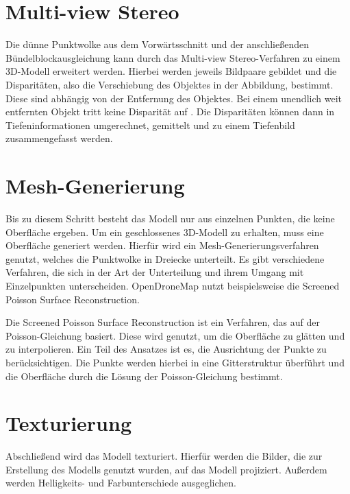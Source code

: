 \documentclass[./00PhotoBox.tex]{subfiles}
\begin{document}
\section{Multi-view Stereo}
Die dünne Punktwolke aus dem Vorwärtsschnitt und der anschließenden Bündel\-block\-ausgleichung kann durch das Multi-view Stereo-Verfahren zu einem 3D-Modell erweitert werden. Hierbei werden jeweils Bildpaare gebildet und die Disparitäten, also die Verschiebung des Objektes in der Abbildung, bestimmt. Diese sind abhängig von der Entfernung des Objektes. Bei einem unendlich weit entfernten Objekt tritt keine Disparität auf \citep[S. 313]{luhmann}. Die Disparitäten können dann in Tiefeninformationen umgerechnet, gemittelt und zu einem Tiefenbild zusammengefasst werden. \citep[S. 505]{luhmann}

\section{Mesh-Generierung}
Bis zu diesem Schritt besteht das Modell nur aus einzelnen Punkten, die keine Oberfläche ergeben. Um ein geschlossenes 3D-Modell zu erhalten, muss eine Oberfläche generiert werden. Hierfür wird ein Mesh-Generierungsverfahren genutzt, welches die Punktwolke in Dreiecke unterteilt. Es gibt verschiedene Verfahren, die sich in der Art der Unterteilung und ihrem Umgang mit Einzelpunkten unterscheiden. OpenDroneMap nutzt beispielsweise die Screened Poisson Surface Reconstruction. \citep[S. 52f]{opendronemap}

Die Screened Poisson Surface Reconstruction ist ein Verfahren, das auf der Poisson-Gleichung basiert. Diese wird genutzt, um die Oberfläche zu glätten und zu interpolieren. Ein Teil des Ansatzes ist es, die Ausrichtung der Punkte zu berücksichtigen. Die Punkte werden hierbei in eine Gitterstruktur überführt und die Oberfläche durch die Lösung der Poisson-Gleichung bestimmt. \citep{spsr}

\section{Texturierung}
Abschließend wird das Modell texturiert. Hierfür werden die Bilder, die zur Erstellung des Modells genutzt wurden, auf das Modell projiziert. Außerdem werden Helligkeits- und Farbunterschiede ausgeglichen. \citep[S. 54f]{opendronemap}

\biblio
\end{document}
